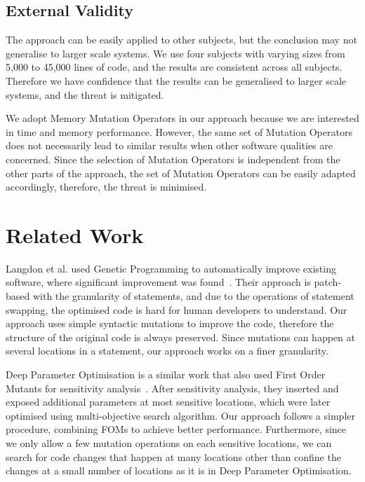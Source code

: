 \documentclass[oribibl]{llncs}
\begin{document}
\subsection{External Validity}
\label{sec_externalvalidity}

The approach can be easily applied to other subjects, but the conclusion may not generalise to larger scale systems.
We use four subjects with varying sizes from 5,000 to 45,000 lines of code, and the results are consistent across all subjects.
Therefore we have confidence that the results can be generalised to larger scale systems, and the threat is mitigated.

We adopt Memory Mutation Operators in our approach because we are interested in time and memory performance.
However, the same set of Mutation Operators does not necessarily lead to similar results when other software qualities are concerned.
Since the selection of Mutation Operators is independent from the other parts of the approach, the set of Mutation Operators can be easily adapted accordingly, therefore, the threat is minimised.

\section{Related Work}
\label{sec_related}

Langdon et al. used Genetic Programming to automatically improve existing software, where significant improvement was found~\cite{6733370,Langdon:2014:IMI:2576768.2598244}.
Their approach is patch-based with the granularity of statements, and due to the operations of statement swapping, the optimised code is hard for human developers to understand.
Our approach uses simple syntactic mutations to improve the code, therefore the structure of the original code is always preserved.
Since mutations can happen at several locations in a statement, our approach works on a finer granularity.

Deep Parameter Optimisation is a similar work that also used First Order Mutants for sensitivity analysis~\cite{Wu:2015:DPO:2739480.2754648}.
After sensitivity analysis, they inserted and exposed additional parameters at most sensitive locations, which were later optimised using multi-objective search algorithm.
Our approach follows a simpler procedure, combining FOMs to achieve better performance.
Furthermore, since we only allow a few mutation operations on each sensitive locations, we can search for code changes that happen at many locations other than confine the changes at a small number of locations as it is in Deep Parameter Optimisation.
\end{document}
